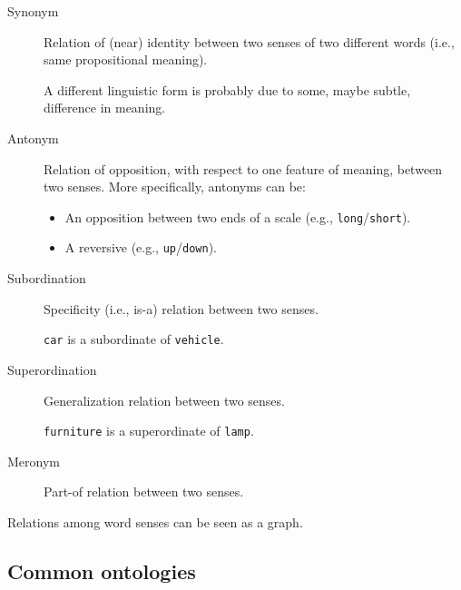 \begin{description}
    \item[Synonym] 
        Relation of (near) identity between two senses of two different words (i.e., same propositional meaning).

        \begin{remark}
            A different linguistic form is probably due to some, maybe subtle, difference in meaning.
        \end{remark}

    \item[Antonym] 
        Relation of opposition, with respect to one feature of meaning, between two senses. More specifically, antonyms can be:
        \begin{itemize}
            \item An opposition between two ends of a scale (e.g., \texttt{long}/\texttt{short}).
            \item A reversive (e.g., \texttt{up}/\texttt{down}).
        \end{itemize}

    \item[Subordination] 
        Specificity (i.e., is-a) relation between two senses.

        \begin{example}
            \texttt{car} is a subordinate of \texttt{vehicle}.
        \end{example}

    \item[Superordination] 
        Generalization relation between two senses.

        \begin{example}
            \texttt{furniture} is a superordinate of \texttt{lamp}.
        \end{example}

    \item[Meronym] 
        Part-of relation between two senses.
\end{description}

\begin{remark}
    Relations among word senses can be seen as a graph.
\end{remark}


\subsection{Common ontologies}

